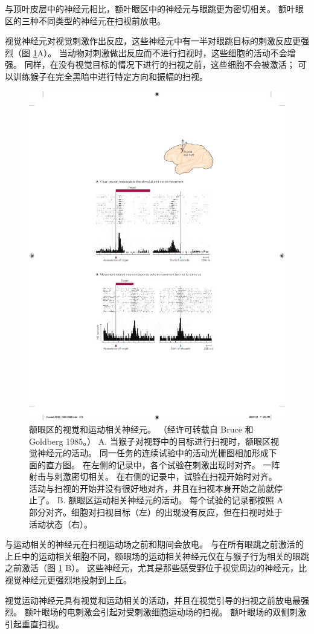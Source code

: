 与顶叶皮层中的神经元相比，额叶眼区中的神经元与眼跳更为密切相关。 额叶眼区的三种不同类型的神经元在扫视前放电。

视觉神经元对视觉刺激作出反应，这些神经元中有一半对眼跳目标的刺激反应更强烈（图 \ref{fig:35_13}A）。 
当动物对刺激做出反应而不进行扫视时，这些细胞的活动不会增强。 同样，在没有视觉目标的情况下进行的扫视之前，这些细胞不会被激活； 可以训练猴子在完全黑暗中进行特定方向和振幅的扫视。

\begin{figure}[htbp]
	\centering
	\includegraphics[width=0.65\linewidth]{chap35/fig_35_13}
	\caption{额眼区的视觉和运动相关神经元。 （经许可转载自 Bruce 和 Goldberg 1985。） A. 当猴子对视野中的目标进行扫视时，额眼区视觉神经元的活动。 同一任务的连续试验中的活动光栅图相加形成下面的直方图。 在左侧的记录中，各个试验在刺激出现时对齐。 一阵射击与刺激密切相关。 在右侧的记录中，试验在扫视开始时对齐。 活动与扫视的开始并没有很好地对齐，并且在扫视本身开始之前就停止了。 B. 额眼区运动相关神经元的活动。 每个试验的记录都按照 A 部分对齐。细胞对扫视目标（左）的出现没有反应，但在扫视时处于活动状态（右）。}
	\label{fig:35_13}
\end{figure}

与运动相关的神经元在扫视运动场之前和期间会放电。 与在所有眼跳之前激活的上丘中的运动相关细胞不同，额眼场的运动相关神经元仅在与猴子行为相关的眼跳之前激活（图 \ref{fig:35_13} B）。 这些神经元，尤其是那些感受野位于视觉周边的神经元，比视觉神经元更强烈地投射到上丘。

视觉运动神经元具有视觉和运动相关的活动，并且在视觉引导的扫视之前放电最强烈。 额叶眼场的电刺激会引起对受刺激细胞运动场的扫视。 额叶眼场的双侧刺激引起垂直扫视。

